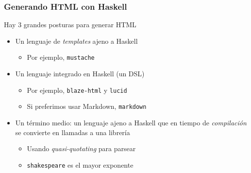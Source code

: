 \documentclass{beamer}
\begin{document}
\begin{frame}[fragile]
\frametitle{Generando HTML con Haskell}
Hay 3 grandes posturas para generar HTML
\begin{itemize}
\item Un lenguaje de \emph{templates} ajeno a Haskell
\begin{itemize}
\item Por ejemplo, {\tt mustache}
\end{itemize}
\item Un lenguaje integrado en Haskell (un DSL)
\begin{itemize}
\item Por ejemplo, {\tt blaze-html} y {\tt lucid}
\item Si preferimos usar Markdown, {\tt markdown}
\end{itemize}
\item Un término medio: un lenguaje ajeno a Haskell que en tiempo de \emph{compilación} se convierte en llamadas a una librería
\begin{itemize}
\item Usando \emph{quasi-quotating} para parsear
\item {\tt shakespeare} es el mayor exponente
\end{itemize}
\end{itemize}
\end{frame}
\end{document}
